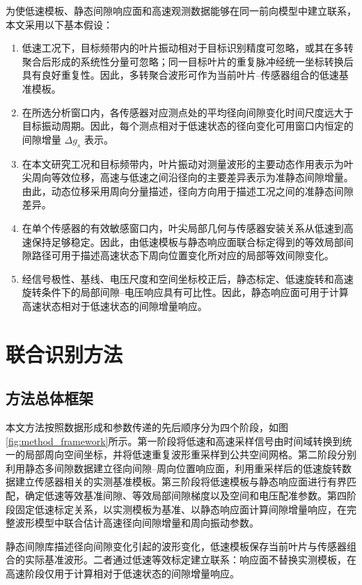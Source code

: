 \documentclass[UTF8,12pt,a4paper]{ctexart}
\begin{document}
为使低速模板、静态间隙响应面和高速观测数据能够在同一前向模型中建立联系，本文采用以下基本假设：
\begin{enumerate}
  \item 低速工况下，目标频带内的叶片振动相对于目标识别精度可忽略，或其在多转聚合后形成的系统性分量可忽略；同一目标叶片的重复脉冲经统一坐标转换后具有良好重复性。因此，多转聚合波形可作为当前叶片--传感器组合的低速基准模板。
  \item 在所选分析窗口内，各传感器对应测点处的平均径向间隙变化时间尺度远大于目标振动周期。因此，每个测点相对于低速状态的径向变化可用窗口内恒定的间隙增量 $\Delta g_s$ 表示。
  \item 在本文研究工况和目标频带内，叶片振动对测量波形的主要动态作用表示为叶尖周向等效位移，高速与低速之间沿径向的主要差异表示为准静态间隙增量。由此，动态位移采用周向分量描述，径向方向用于描述工况之间的准静态间隙差异。
  \item 在单个传感器的有效敏感窗口内，叶尖局部几何与传感器安装关系从低速到高速保持足够稳定。因此，由低速模板与静态响应面联合标定得到的等效局部间隙路径可用于描述高速状态下周向位置变化所对应的局部等效间隙变化。
  \item 经信号极性、基线、电压尺度和空间坐标校正后，静态标定、低速旋转和高速旋转条件下的局部间隙--电压响应具有可比性。因此，静态响应面可用于计算高速状态相对于低速状态的间隙增量响应。
\end{enumerate}

\section{联合识别方法}

\subsection{方法总体框架}

本文方法按照数据形成和参数传递的先后顺序分为四个阶段，如图\ref{fig:method_framework}所示。第一阶段将低速和高速采样信号由时间域转换到统一的局部周向空间坐标，并将低速重复波形重采样到公共空间网格。第二阶段分别利用静态多间隙数据建立径向间隙--周向位置响应面，利用重采样后的低速旋转数据建立传感器相关的实测基准模板。第三阶段将低速模板与静态响应面进行有界匹配，确定低速等效基准间隙、等效局部间隙梯度以及空间和电压配准参数。第四阶段固定低速标定关系，以实测模板为基准、以静态响应面计算间隙增量响应，在完整波形模型中联合估计高速径向间隙增量和周向振动参数。

静态间隙库描述径向间隙变化引起的波形变化，低速模板保存当前叶片与传感器组合的实际基准波形。二者通过低速等效标定建立联系：响应面不替换实测模板，在高速阶段仅用于计算相对于低速状态的间隙增量响应。
\end{document}
